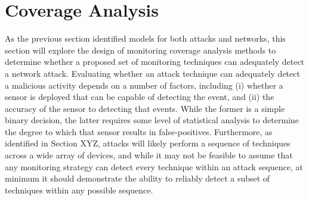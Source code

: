 \documentclass[journal]{IEEEtran}
\begin{document}
\section{Coverage Analysis}
As the previous section identified models for both attacks and networks, this section will explore the design of monitoring coverage analysis methods to determine whether a proposed set of monitoring techniques can adequately detect a network attack. Evaluating whether an attack technique can adequately detect a malicious activity depends on a number of factors, including (i) whether a sensor is deployed that can be capable of detecting the event, and (ii) the accuracy of the sensor to detecting that events. While the former is a simple binary decision, the latter requires some level of statistical analysis to determine the degree to which that sensor results in false-positives. Furthermore, as identified in Section XYZ, attacks will likely perform a sequence of techniques across a wide array of devices, and while it may not be feasible to assume that any monitoring strategy can detect every technique within an attack sequence, at minimum it should demonstrate the ability to reliably detect a subset of techniques within any possible sequence. 

\end{document}

